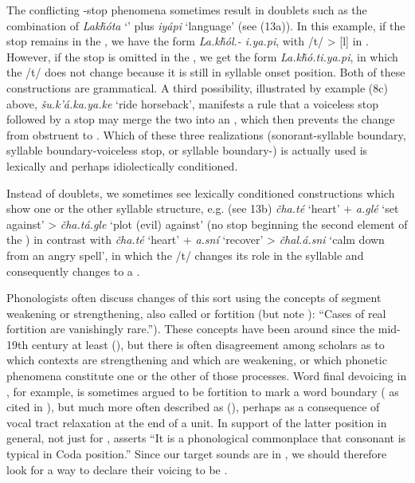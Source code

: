 \documentclass[output=paper]{LSP/langsci}
\begin{document}
The conflicting -stop phenomena sometimes result in doublets such as the combination of \textit{Lak\v{h}\'ota} `' plus \textit{iy\'api} `language' (see (13a)). In this example, if the  stop remains in the , we have the form \textit{La.k\v{h}\'ol.- i.ya.pi}, with /t/ > [l] in . However, if the  stop is omitted in the , we get the form \textit{La.k\v{h}\'o.ti.ya.pi}, in which the /t/ does not change because it is still in syllable onset position. Both of these constructions are grammatical. A third possibility, illustrated by example (8c) above, \textit{\v{s}u.k'\'a.ka.ya.ke} `ride horseback', manifests a rule that a voiceless stop followed by a  stop may merge the two into an , which then prevents the change from obstruent to . Which of these three realizations (sonorant-syllable boundary, syllable boundary-voiceless stop, or syllable boundary-) is actually used is lexically and perhaps idiolectically conditioned.

Instead of doublets, we sometimes see lexically conditioned constructions which show one or the other syllable structure, e.g. (see 13b) \textit{\v{c}ha.t\'e} `heart' + \textit{a.gl\'e} `set against' > \textit{\v{c}ha.t\'a.gle} `plot (evil) against' (no  stop beginning the second element of the ) in contrast with \textit{\v{c}ha.t\'e} `heart' + \textit{a.sn\'i} `recover' > \textit{\v{c}hal.\'a.sni} `calm down from an angry spell', in which the /t/ changes its role in the syllable and consequently changes to a .

Phonologists often discuss changes of this sort using the concepts of segment weakening or strengthening, also called  or fortition (but note \citealt[10]{Honeybone2008}): ``Cases of real fortition are vanishingly rare.''). These concepts have been around since the mid-19th century at least (\citealt{Honeybone2008}), but there is often disagreement among scholars as to which contexts are strengthening and which are weakening, or which phonetic phenomena constitute one or the other of those processes. Word final devoicing in , for example, is sometimes argued to be fortition to mark a word boundary (\citealt{IversonSalmons2007} as cited in \citealt{Harris2009}), but much more often described as  (\citealt{Harris2009}), perhaps as a consequence of vocal tract relaxation at the end of a unit. In support of the latter position in general, not just for , \citet[112]{Szigetvari2008} asserts ``It is a phonological commonplace that consonant  is typical in Coda position.'' Since our target sounds are in , we should therefore look for a way to declare their voicing to be .
\end{document}
